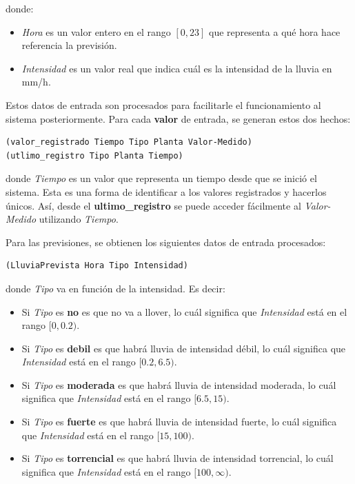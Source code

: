 \documentclass[11pt,a4paper]{article}
\begin{document}
\noindent donde:

\begin{itemize}
	\item \textit{Hora} es un valor entero en el rango $[0, 23]$ que representa a qué hora hace referencia la previsión.
	\item \textit{Intensidad} es un valor real que indica cuál es la intensidad de la lluvia en mm/h.
\end{itemize}

Estos datos de entrada son procesados para facilitarle el funcionamiento al sistema posteriormente. Para cada \textbf{valor}
de entrada, se generan estos dos hechos:

\begin{lstlisting}
(valor_registrado Tiempo Tipo Planta Valor-Medido)
(utlimo_registro Tipo Planta Tiempo)
\end{lstlisting}

\noindent donde \textit{Tiempo} es un valor que representa un tiempo desde que se inició el sistema. Esta es una forma
de identificar a los valores registrados y hacerlos únicos. Así, desde el \textbf{ultimo\_registro} se puede acceder fácilmente
al \textit{Valor-Medido} utilizando \textit{Tiempo}.

Para las previsiones, se obtienen los siguientes datos de entrada procesados:

\begin{lstlisting}
(LluviaPrevista Hora Tipo Intensidad)
\end{lstlisting}

\noindent donde \textit{Tipo} va en función de la intensidad. Es decir:

\begin{itemize}
	\item Si \textit{Tipo} es \textbf{no} es que no va a llover, lo cuál significa que \textit{Intensidad} está en el
	rango $[0, 0.2)$.
	\item Si \textit{Tipo} es \textbf{debil} es que habrá lluvia de intensidad débil, lo cuál significa que
	\textit{Intensidad} está en el rango $[0.2, 6.5)$.
	\item Si \textit{Tipo} es \textbf{moderada} es que habrá lluvia de intensidad moderada, lo cuál significa que
	\textit{Intensidad} está en el rango $[6.5, 15)$.
	\item Si \textit{Tipo} es \textbf{fuerte} es que habrá lluvia de intensidad fuerte, lo cuál significa que
	\textit{Intensidad} está en el rango $[15, 100)$.
	\item Si \textit{Tipo} es \textbf{torrencial} es que habrá lluvia de intensidad torrencial, lo cuál significa que
	\textit{Intensidad} está en el rango $[100, \infty)$.
\end{itemize}
\end{document}
